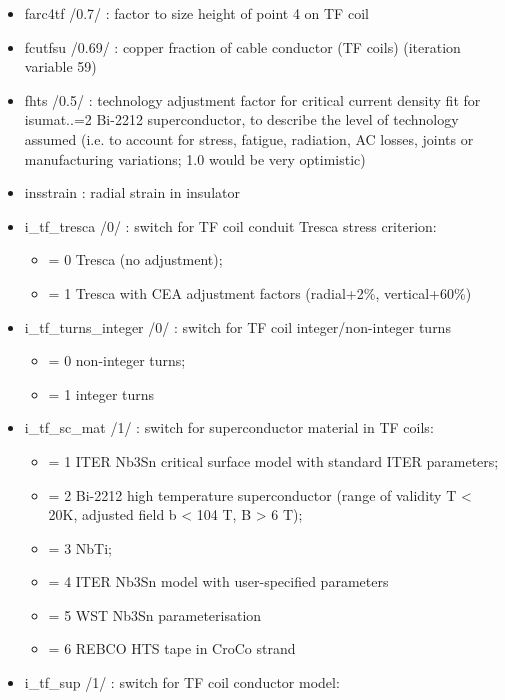 \documentclass[]{article}
\providecommand{\tightlist}{%
  \setlength{\itemsep}{0pt}\setlength{\parskip}{0pt}}
\begin{document}
\begin{itemize}
\item
  farc4tf /0.7/ : factor to size height of point 4 on TF coil
\item
  fcutfsu /0.69/ : copper fraction of cable conductor (TF coils)
  (iteration variable 59)
\item
  fhts /0.5/ : technology adjustment factor for critical current density
  fit for isumat..=2 Bi-2212 superconductor, to describe the level of
  technology assumed (i.e. to account for stress, fatigue, radiation, AC
  losses, joints or manufacturing variations; 1.0 would be very
  optimistic)
\item
  insstrain : radial strain in insulator
\item
  i\_tf\_tresca /0/ : switch for TF coil conduit Tresca stress
  criterion:

  \begin{itemize}
  \tightlist
  \item
    = 0 Tresca (no adjustment);
  \item
    = 1 Tresca with CEA adjustment factors (radial+2\%, vertical+60\%)
  \end{itemize}
\item
  i\_tf\_turns\_integer /0/ : switch for TF coil integer/non-integer
  turns

  \begin{itemize}
  \tightlist
  \item
    = 0 non-integer turns;
  \item
    = 1 integer turns
  \end{itemize}
\item
  i\_tf\_sc\_mat /1/ : switch for superconductor material in TF coils:

  \begin{itemize}
  \tightlist
  \item
    = 1 ITER Nb3Sn critical surface model with standard ITER parameters;
  \item
    = 2 Bi-2212 high temperature superconductor (range of validity T
    \textless{} 20K, adjusted field b \textless{} 104 T, B
    \textgreater{} 6 T);
  \item
    = 3 NbTi;
  \item
    = 4 ITER Nb3Sn model with user-specified parameters
  \item
    = 5 WST Nb3Sn parameterisation
  \item
    = 6 REBCO HTS tape in CroCo strand
  \end{itemize}
\item
  i_tf_sup /1/ : switch for TF coil conductor model:


\end{itemize}
\end{document}
